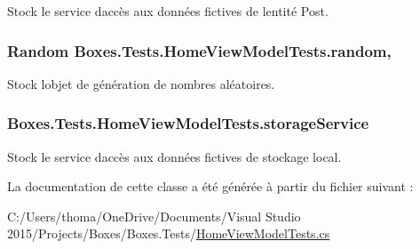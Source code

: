 Stock le service d\textquotesingle{}accès aux données fictives de l\textquotesingle{}entité Post. 

\subsubsection[{\texorpdfstring{random}{random}}]{\setlength{\rightskip}{0pt plus 5cm}Random Boxes.\+Tests.\+Home\+View\+Model\+Tests.\+random\hspace{0.3cm}{\ttfamily [static]}, {\ttfamily [private]}}\hypertarget{class_boxes_1_1_tests_1_1_home_view_model_tests_aa651dd64428e19075fded9c393db63c3}{}\label{class_boxes_1_1_tests_1_1_home_view_model_tests_aa651dd64428e19075fded9c393db63c3}


Stock l\textquotesingle{}objet de génération de nombres aléatoires. 

\subsubsection[{\texorpdfstring{storage\+Service}{storageService}}]{ Boxes.\+Tests.\+Home\+View\+Model\+Tests.\+storage\+Service\hspace{0.3cm}{\ttfamily [private]}}\hypertarget{class_boxes_1_1_tests_1_1_home_view_model_tests_a3cef168c7e8bcdbee02a6713e4541105}{}\label{class_boxes_1_1_tests_1_1_home_view_model_tests_a3cef168c7e8bcdbee02a6713e4541105}


Stock le service d\textquotesingle{}accès aux données fictives de stockage local. 



La documentation de cette classe a été générée à partir du fichier suivant \+:\begin{DoxyCompactItemize}
\item 
C\+:/\+Users/thoma/\+One\+Drive/\+Documents/\+Visual Studio 2015/\+Projects/\+Boxes/\+Boxes.\+Tests/\hyperlink{_home_view_model_tests_8cs}{Home\+View\+Model\+Tests.\+cs}\end{DoxyCompactItemize}
